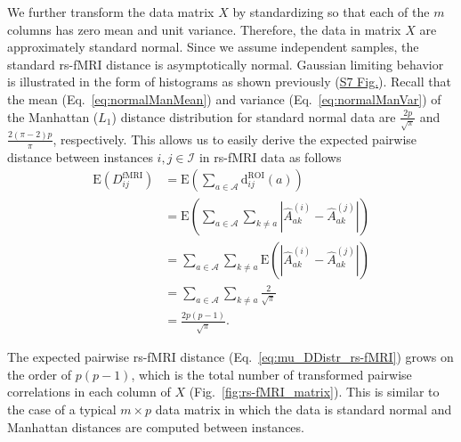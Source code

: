 \documentclass[10pt,letterpaper]{article}
\begin{document}
We further transform the data matrix $X$ by standardizing so that each of the $m$ columns has zero mean and unit variance. Therefore, the data in matrix $X$ are approximately standard normal. Since we assume independent samples, the standard rs-fMRI distance is asymptotically normal. Gaussian limiting behavior is illustrated in the form of histograms as shown previously (\hyperlink{S7_Fig}{S7 Fig.}). Recall that the mean (Eq.~\ref{eq:normalManMean}) and variance (Eq.~\ref{eq:normalManVar}) of the Manhattan ($L_1$) distance distribution for standard normal data are $\frac{2p}{\sqrt{\pi}}$ and $\frac{2(\pi - 2)p}{\pi}$, respectively. This allows us to easily derive the expected pairwise distance between instances $i,j \in \mathcal{I}$ in rs-fMRI data as follows
%
\begin{equation}\label{eq:mu_DDistr_rs-fMRI}
\begin{aligned}
\text{E}(D^\text{fMRI}_{ij}) &= \text{E}\left(\sum_{a \in \mathcal{A}} \text{d}^\text{ROI}_{ij}(a)\right) \\
&= \text{E}\left(\sum_{a \in \mathcal{A}} \sum_{k \neq a} \left|\hat{A}^{(i)}_{ak} - \hat{A}^{(j)}_{ak}\right|\right) \\
&= \sum_{a \in \mathcal{A}} \sum_{k \neq a} \text{E}\left(\left|\hat{A}^{(i)}_{ak} - \hat{A}^{(j)}_{ak}\right|\right) \\
&= \sum_{a \in \mathcal{A}} \sum_{k \neq a} \frac{2}{\sqrt{\pi}} \\
&= \frac{2p(p-1)}{\sqrt{\pi}}.
\end{aligned}
\end{equation}

The expected pairwise rs-fMRI distance (Eq.~\ref{eq:mu_DDistr_rs-fMRI}) grows on the order of $p(p-1)$, which is the total number of transformed pairwise correlations in each column of $X$ (Fig.~\ref{fig:rs-fMRI_matrix}). This is similar to the case of a typical $m \times p$ data matrix in which the data is standard normal and Manhattan distances are computed between instances. 
\end{document}
